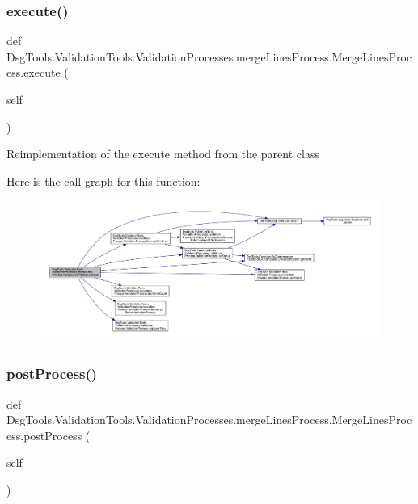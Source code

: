 \subsubsection{\texorpdfstring{execute()}{execute()}}
{\footnotesize\ttfamily def Dsg\+Tools.\+Validation\+Tools.\+Validation\+Processes.\+merge\+Lines\+Process.\+Merge\+Lines\+Process.\+execute (\begin{DoxyParamCaption}\item[{}]{self }\end{DoxyParamCaption})}

\begin{DoxyVerb}Reimplementation of the execute method from the parent class
\end{DoxyVerb}
 Here is the call graph for this function\+:
\nopagebreak
\begin{figure}[H]
\begin{center}
\leavevmode
\includegraphics[width=350pt]{class_dsg_tools_1_1_validation_tools_1_1_validation_processes_1_1merge_lines_process_1_1_merge_lines_process_a08ced55b571d27565f10e2834604e8c7_cgraph}
\end{center}
\end{figure}
\mbox{\label{class_dsg_tools_1_1_validation_tools_1_1_validation_processes_1_1merge_lines_process_1_1_merge_lines_process_aff17cedf1d08ff12a85531d40c0dd43a}} 
\subsubsection{\texorpdfstring{post\+Process()}{postProcess()}}
{\footnotesize\ttfamily def Dsg\+Tools.\+Validation\+Tools.\+Validation\+Processes.\+merge\+Lines\+Process.\+Merge\+Lines\+Process.\+post\+Process (\begin{DoxyParamCaption}\item[{}]{self }\end{DoxyParamCaption})}


